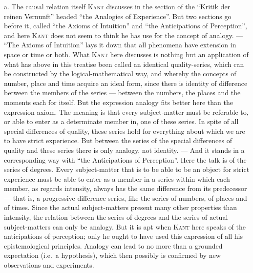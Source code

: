 \documentclass[12pt]{book}
\newcommand{\opage}[1]{\marginnote{\footnotesize\textit{[#1]}}}
\begin{document}
a. The causal relation itself \textsc{Kant} discusses in the section of the
``Kritik der reinen Vernunft'' headed ``the Analogies of Experience''. But two
sections go before it, called ``the Axioms of Intuition'' and ``the Anticipations
of Perception'', and here \textsc{Kant} does not seem to think he has use for the
concept of analogy. --- ``The Axioms of Intuition'' lays it down that all
phenomena have extension in space or time or both. What \textsc{Kant} here
discusses is nothing but an application of what has above in this treatise been
called an identical quality-series, which can be constructed by the
logical-mathematical way, and whereby the concepts of number, place \opage{91}and time
acquire an ideal form, since there is identity of difference between the members
of the series --- between the numbers, the places and the moments each for
itself. But the expression analogy fits better here than the expression axiom.
The meaning is that every subject-matter must be referable to, or able to enter
as a determinate member in, one of these series. In spite of all special
differences of quality, these series hold for everything about which we are to
have strict experience. But between the series of the special differences of
quality and these series there is only analogy, not identity. --- And it stands
in a corresponding way with ``the Anticipations of Perception''. Here the talk is
of the series of degrees. Every subject-matter that is to be able to be an object
for strict experience must be able to enter as a member in a series within which
each member, as regards intensity, always has the same difference from its
predecessor --- that is, a progressive difference-series, like the series of
numbers, of places and of times. Since the actual subject-matters present many
other properties than intensity, the relation between the series of degrees and
the series of actual subject-matters can only be analogy. But it is apt when
\textsc{Kant} here speaks of the anticipations of perception; only he ought to
have used this expression of all his epistemological principles. Analogy can lead
to no more than a grounded expectation (i.e.\ a hypothesis), which then possibly
is confirmed by new observations and experiments.
\end{document}
